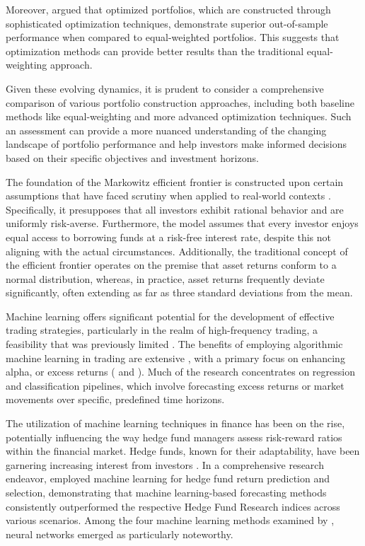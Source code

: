 Moreover, \citep{Kritzman201031} argued that optimized portfolios, which are constructed through sophisticated optimization techniques, demonstrate superior out-of-sample performance when compared to equal-weighted portfolios. This suggests that optimization methods can provide better results than the traditional equal-weighting approach.

Given these evolving dynamics, it is prudent to consider a comprehensive comparison of various portfolio construction approaches, including both baseline methods like equal-weighting and more advanced optimization techniques. Such an assessment can provide a more nuanced understanding of the changing landscape of portfolio performance and help investors make informed decisions based on their specific objectives and investment horizons.

The foundation of the Markowitz efficient frontier is constructed upon certain assumptions that have faced scrutiny when applied to real-world contexts \citep{Ma2021}. Specifically, it presupposes that all investors exhibit rational behavior and are uniformly risk-averse. Furthermore, the model assumes that every investor enjoys equal access to borrowing funds at a risk-free interest rate, despite this not aligning with the actual circumstances. Additionally, the traditional concept of the efficient frontier operates on the premise that asset returns conform to a normal distribution, whereas, in practice, asset returns frequently deviate significantly, often extending as far as three standard deviations from the mean.

 Machine learning offers significant potential for the development of effective trading strategies, particularly in the realm of high-frequency trading, a feasibility that was previously limited \citep{Arnott201964}. The benefits of employing algorithmic machine learning in trading are extensive \citep{Zhang202025}, with a primary focus on enhancing alpha, or excess returns (\citep{Sirignano20191449} and \citep{Zhang20193001}). Much of the research concentrates on regression and classification pipelines, which involve forecasting excess returns or market movements over specific, predefined time horizons.

The utilization of machine learning techniques in finance has been on the rise, potentially influencing the way hedge fund managers assess risk-reward ratios within the financial market. Hedge funds, known for their adaptability, have been garnering increasing interest from investors \citep{Wu20218119}. In a comprehensive research endeavor, \citep{Wu20218119} employed machine learning for hedge fund return prediction and selection, demonstrating that machine learning-based forecasting methods consistently outperformed the respective Hedge Fund Research indices across various scenarios. Among the four machine learning methods examined by \citep{Wu20218119}, neural networks emerged as particularly noteworthy.

